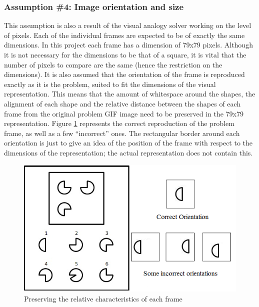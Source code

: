 \documentclass[10pt, letter]{article}
\begin{document}
	\subsubsection*{Assumption \#4: Image orientation and size}
This assumption is also a result of the visual analogy solver working on the level of pixels. Each of the individual frames are expected to be of exactly the same dimensions. In this project each frame has a dimension of 79x79 pixels. Although it is not necessary for the dimensions to be that of a square, it is vital that the number of pixels to compare are the same (hence the restriction on the dimensions). It is also assumed that the orientation of the frame is reproduced exactly as it is the problem, suited to fit the dimensions of the visual representation. This means that the amount of whitespace around the shapes, the alignment of each shape and the relative distance between the shapes of each frame from the original problem GIF image need to be preserved in the 79x79 representation. Figure \ref{fig3} represents the correct reproduction of the problem frame, as well as a few ``incorrect'' ones. The rectangular border around each orientation is just to give an idea of the position of the frame with respect to the dimensions of the representation; the actual representation does not contain this.
\begin{figure}[h!]
  \centering
    \includegraphics[scale = 0.5]{Images/Fig3}
    \caption{Preserving the relative characteristics of each frame}
  \label{fig3}
\end{figure}
\end{document}
